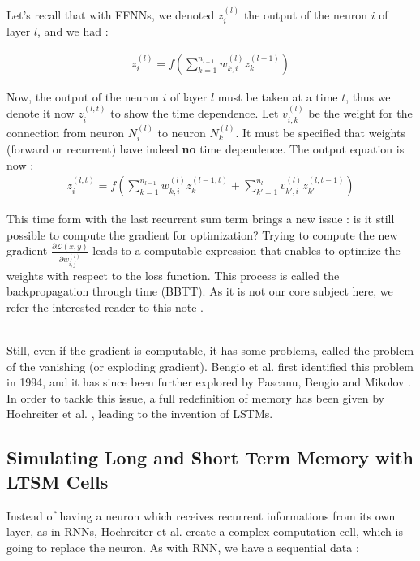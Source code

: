\documentclass{article}
\begin{document}
\noindent Let's recall that with FFNNs, we denoted $z_i^{(l)}$ the output of the neuron $i$ of layer $l$, and we had :

\begin{align*}
    z_i^{(l)} = f \left ( \sum_{k=1}^{n_{l-1}} w_{k, i}^{(l)} z_{k}^{(l-1)} \right )
\end{align*}

\noindent Now,  the output of the neuron $i$ of layer $l$ must be taken at a time $t$, thus we denote it now
$z_i^{(l, t)}$ to show the  time dependence. Let $v_{i, k}^{(l)}$ be the weight for the connection from neuron $N_i^{(l)}$ to neuron $N_{k}^{(l)}$.
It must be specified that weights (forward or recurrent) have indeed \textbf{no} time 
dependence. 
The output equation is now : 
\begin{align} \label{eq:rnn1}
    z_i^{(l, t)} = f \left ( \sum_{k=1}^{n_{l-1}} w_{k, i}^{(l)} z_{k}^{(l-1, t)} 
                        + \sum_{k'=1}^{n_l} v_{k', i}^{(l)} z_{k'}^{(l, t-1)}
                        \right )
\end{align}

This time form with the last recurrent sum term brings a new issue : is it still possible
to compute the gradient for optimization? Trying to compute the new gradient
 $\frac{\partial \mathcal{L}(x, y)}{\partial w_{i, j}^{(l)} }$ leads to a computable 
 expression that enables to optimize the weights with respect to the loss function. 
 This process is called the backpropagation through time (BBTT). As it is not our core 
 subject here, we refer the interested reader to this note \cite{Guo2013}. \\ \par

 Still, even if the gradient is computable, it has some problems, called the problem 
 of the vanishing (or exploding gradient). Bengio et al. \cite{Bengio1994} first identified 
 this problem in 1994, and it has since been further explored by Pascanu, Bengio and Mikolov
 \cite{Pascanu2013}. In order to tackle this issue, a full redefinition of memory has been 
 given by Hochreiter et al. \cite{doi:10.1162/neco.1997.9.8.1735}, leading to the invention of LSTMs.


\subsection{Simulating Long and Short Term Memory with LTSM Cells} \label{subsec:lstm}

Instead of having a neuron which receives recurrent informations from its own layer, as in RNNs, 
Hochreiter et al. \cite{doi:10.1162/neco.1997.9.8.1735} create a complex computation cell, 
which is going to replace the neuron. As with RNN, we have a sequential data :
\end{document}
